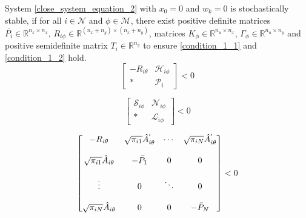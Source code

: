 \documentclass[conference]{IEEEtran}
\begin{document}
%
%
%

System \eqref{close_system_equation_2} with $x_0=0$ and $w_{k}=0$ is stochastically stable, if for all $i \in \mathcal{N}$ and $\phi \in \mathcal{M}$, there exist positive definite matrices $\bar{P_i} \in \mathbb{R}^{n_x\times n_x}$, $R_{i\phi } \in \mathbb{R}^{(n_x+n_y)\times(n_x+n_y)}$, matrices $K_{\phi} \in \mathbb{R}^{n_u\times n_x}$, $\varGamma_{\phi} \in \mathbb{R}^{n_u \times n_y}$ and positive semidefinite matrix $T_{i}\in \mathbb{R}^{n_y}$ to  ensure \eqref{condition_1_1} and \eqref{condition_1_2} hold.
\begin{equation}\label{condition_1_1}
\begin{bmatrix}
-R_{i\theta}&\mathscr{H}_{i\phi}\\
*&\mathscr{P}_{i}
\end{bmatrix}<0
\end{equation}


\begin{equation}\label{condition_1_2}
\begin{bmatrix}
\mathscr{S}_{i\phi}&\mathscr{N}_{i\phi}\\
*&\mathscr{L}_{i\phi}
\end{bmatrix}<0
\end{equation}


\begin{equation}\notag
\begin{bmatrix}
-R_{i\theta}&\sqrt{\pi_{i1}}\hat{A}^{'}_{i\theta}&\cdots&\sqrt{\pi_{iN}}\hat{A}^{'}_{i\theta}\\ \\
\sqrt{\pi_{i1}}\hat{A}_{i\theta}&-\bar{P_1}&0&0\\ \\
\vdots &0&\ddots&0\\ \\
\sqrt{\pi_{iN}}\hat{A}_{i\theta}&0&0& -\bar{P}_{N}
\end{bmatrix}<0
\end{equation}
\end{document}
